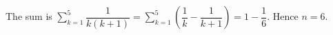 The sum is $\sum_{k=1}^5\dfrac{1}{k(k+1)}=\sum_{k=1}^5(\dfrac{1}{k}-\dfrac{1}{k+1})=1-\dfrac{1}{6}$. Hence $\boxed{n=6}$.
